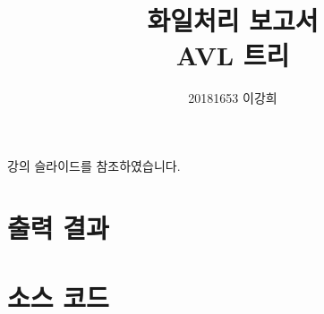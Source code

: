 \documentclass[10pt]{article}
\title{화일처리 보고서\\AVL 트리}
\author{20181653 이강희}
\begin{document}
\maketitle

\begin{center}
강의 슬라이드를 참조하였습니다.
\end{center}

\newpage

\section{출력 결과}



\section{소스 코드}

\inputminted{cpp}{main.cpp}
\end{document}

